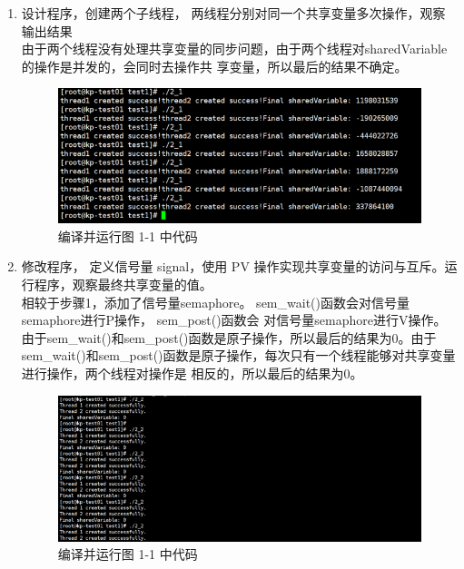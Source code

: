 \documentclass{article}
\begin{document}
    \begin{enumerate}
        \item 设计程序，创建两个子线程， 两线程分别对同一个共享变量多次操作，观察输出结果
        \\由于两个线程没有处理共享变量的同步问题，由于两个线程对sharedVariable的操作是并发的，会同时去操作共
        享变量，所以最后的结果不确定。
        \begin{figure}[htbp]
            \centering
            \includegraphics[scale=0.6]{picture/8.png}
            \caption{编译并运行图 1-1 中代码}
            \label{8}
        \end{figure} 

        \item 修改程序， 定义信号量 signal，使用 PV 操作实现共享变量的访问与互斥。运行程序，观察最终共享变量的值。
        \\相较于步骤1，添加了信号量semaphore。 sem\_wait()函数会对信号量semaphore进行P操作， sem\_post()函数会
        对信号量semaphore进行V操作。由于sem\_wait()和sem\_post()函数是原子操作，所以最后的结果为0。由于sem\_wait()和sem\_post()函数是原子操作，每次只有一个线程能够对共享变量进行操作，两个线程对操作是
        相反的，所以最后的结果为0。

        \begin{figure}[htbp]
            \centering
            \includegraphics[scale=0.6]{picture/9.png}
            \caption{编译并运行图 1-1 中代码}
            \label{9}
        \end{figure}


\end{enumerate}
\end{document}
